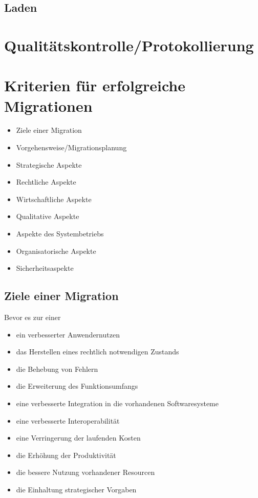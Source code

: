 \subsection{Laden}
 

\section{Qualitätskontrolle/Protokollierung}

\section{Kriterien für erfolgreiche Migrationen}
\begin{itemize}

  \item Ziele einer Migration
  \item Vorgehensweise/Migrationsplanung
  \item Strategische Aspekte
  \item Rechtliche Aspekte
  \item Wirtschaftliche Aspekte
  \item Qualitative Aspekte
  \item Aspekte des Systembetriebs
  \item Organisatorische Aspekte
  \item Sicherheitsaspekte
\end{itemize}
\subsection{Ziele einer Migration}
Bevor es zur einer 
\begin{itemize}
  \item ein verbesserter Anwendernutzen
  \item das Herstellen eines rechtlich notwendigen Zustands
  \item die Behebung von Fehlern
  \item die Erweiterung des Funktionsumfangs
  \item eine verbesserte Integration in die vorhandenen Softwaresysteme
  \item eine verbesserte Interoperabilität
  \item eine Verringerung der laufenden Kosten
  \item die Erhöhung der Produktivität
  \item die bessere Nutzung vorhandener Resourcen
  \item die Einhaltung strategischer Vorgaben
\end{itemize}
